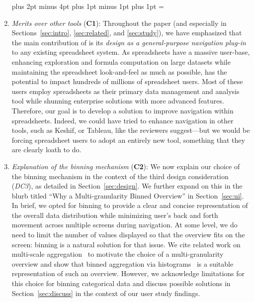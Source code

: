 \begin{enumerate}
\leftmargin=25pt \rightmargin=0pt   \itemindent=0pt \listparindent=0pt \topsep=0pt plus 2pt minus 4pt \partopsep=0pt plus 1pt minus 1pt \parsep=0pt plus 1pt \itemsep=\parsep

\item \textit{Merits over other tools} (\textbf{C1}): 
Throughout the paper (and especially in 
Sections~\ref{sec:intro}, \ref{sec:related},
and \ref{sec:study}), we have emphasized
that the main contribution of \noah
is its \emph{design as a general-purpose navigation plug-in} 
to any existing spreadsheet system. 
As spreadsheets have a massive user-base, 
enhancing exploration and formula computation 
on large datasets while maintaining 
the spreadsheet look-and-feel as much as possible, 
has the potential to impact hundreds of millions 
of spreadsheet users. 
Most of these users employ spreadsheets 
as their primary data management and analysis 
tool while shunning enterprise solutions 
with more advanced features. 
Therefore, our goal is to develop a 
solution to improve navigation within spreadsheets.
Indeed, we could have tried to enhance navigation
in other tools, such as Keshif, or Tableau, like
the reviewers suggest---but we would be forcing
spreadsheet users to adopt an entirely new tool, something
that they are clearly loath to do. 

\item \textit{Explanation of the binning mechanism} (\textbf{C2}): 
We now explain our choice
of the binning mechanism in 
the context of the third design consideration (\emph{DC3}), 
as detailed in Section~\ref{sec:design}.
We further expand on this in the blurb titled 
``Why a Multi-granularity Binned Overview'' 
in Section~\ref{sec:ui}.
In brief, we opted for binning to 
provide a clear and concise 
representation of the overall data 
distribution while minimizing user's back 
and forth movement across multiple screens 
during navigation. 
At some level, we do need to limit the number
of values displayed so that the overview
fits on the screen: binning is a natural solution
for that issue. 
We cite related work on 
multi-scale aggregation~\cite{elmqvist2009hierarchical} 
to motivate the choice of 
a multi-granularity overview
and show that binned aggregation via histograms~\cite{liu2013immens}
is a suitable representation of such an overview.
However, we acknowledge limitations 
for this choice for binning categorical data 
and discuss possible solutions 
in Section~\ref{sec:discuss} 
in the context of our user study findings. 



\end{enumerate}
